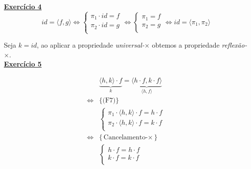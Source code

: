 \documentclass[a4paper,11pt]{article}
\begin{document}
	
	\noindent \underline{\textbf{Exercício 4}}
	\[
		id = \langle f, g \rangle \iff
		\begin{cases}
			\pi_1 \cdot id = f\\
			\pi_2 \cdot id = g\\
		\end{cases}
		\iff
		\begin{cases}
			\pi_1 = f \\
			\pi_2 = g \\
		\end{cases}
		\iff id = \langle \pi_1, \pi_2 \rangle
	\]
	
	\noindent Seja $ k = id $, ao aplicar a propriedade \textit{universal-$\times$} obtemos a propriedade \textit{reflexão-$\times$}.\\
	
	
	\noindent \underline{\textbf{Exercício 5}}
	\begin{center}
		\begin{minipage}{0.45\textwidth}
			\begin{mdframed}
				\[
				\begin{aligned}
					&\underbrace{\langle h, k\rangle \cdot f}_{k} = \underbrace{\langle h \cdot f, k \cdot f \rangle}_{\langle h, f \rangle} \\
					\iff &\{\text{(F7)}\} \\
					&\begin{cases}
						\pi_1 \cdot \langle h, k \rangle \cdot f = h \cdot f \\
						\pi_2 \cdot \langle h, k \rangle \cdot f = k \cdot f \\
					\end{cases}\\
					\iff &\{\text{Cancelamento-$\times$}\} \\
					&\begin{cases}
						h \cdot f = h \cdot f \\
						k \cdot f = k \cdot f\\
					\end{cases}
				\end{aligned}
				\]
			\end{mdframed}
		\end{minipage}
	\end{center}
	
\end{document}
